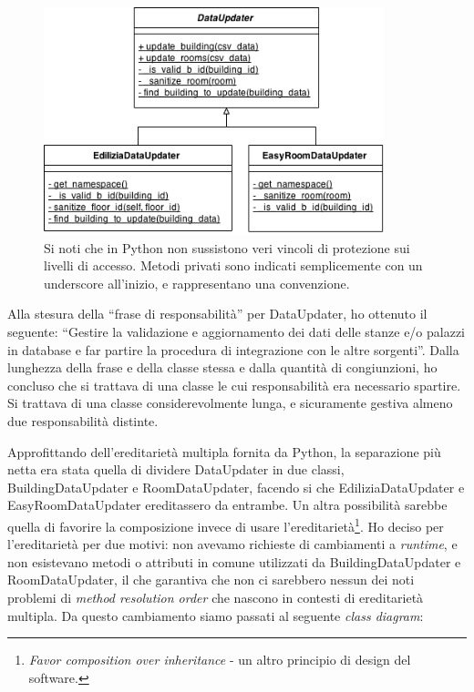 \documentclass[12pt]{report}
\begin{document}
\begin{figure}[H]
    \centering
    \includegraphics[width=280pt]{class_diagram_dataupdater_before.png}
    \caption{Si noti che in Python non sussistono veri vincoli di protezione
    sui livelli di accesso. Metodi privati sono indicati semplicemente con
    un underscore all'inizio, e rappresentano una convenzione.}
    \label{fig:class_diagram_dataupdater_before}
\end{figure}

Alla stesura della ``frase di responsabilità'' per DataUpdater, ho
ottenuto il seguente: 
``Gestire la validazione e aggiornamento dei dati delle stanze 
e/o palazzi in database e far partire la procedura di integrazione
con le altre sorgenti''. 
Dalla lunghezza della frase e della classe stessa e dalla quantità di 
congiunzioni, ho concluso che si trattava di una classe le cui responsabilità
era necessario spartire. Si trattava di una classe considerevolmente lunga, 
e sicuramente gestiva almeno due responsabilità distinte.

Approfittando dell'ereditarietà multipla fornita da Python, la separazione più netta
era stata quella di dividere DataUpdater in due classi, 
BuildingDataUpdater e RoomDataUpdater, facendo si che EdiliziaDataUpdater 
e EasyRoomDataUpdater ereditassero da entrambe. Un altra possibilità 
sarebbe quella di favorire la composizione invece di usare l'ereditarietà\footnote{
\textit{Favor composition over inheritance} - un altro principio di
design del software.
}. 
Ho deciso per l'ereditarietà per due motivi: non avevamo richieste di 
cambiamenti a \textit{runtime}, e non esistevano metodi o attributi 
in comune utilizzati da BuildingDataUpdater e RoomDataUpdater, il che garantiva 
che non ci sarebbero nessun dei noti problemi di \textit{method resolution 
order} che nascono in contesti di ereditarietà multipla. Da questo cambiamento
siamo passati al seguente \textit{class diagram}:
\end{document}
